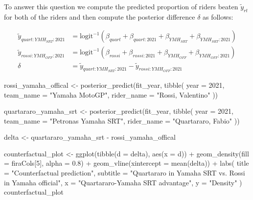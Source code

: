 \documentclass[
]{article}
\newenvironment{Shaded}{\begin{snugshade}}{\end{snugshade}}
\newcommand{\AttributeTok}[1]{\textcolor[rgb]{0.77,0.63,0.00}{#1}}
\newcommand{\DecValTok}[1]{\textcolor[rgb]{0.00,0.00,0.81}{#1}}
\newcommand{\FloatTok}[1]{\textcolor[rgb]{0.00,0.00,0.81}{#1}}
\newcommand{\FunctionTok}[1]{\textcolor[rgb]{0.00,0.00,0.00}{#1}}
\newcommand{\NormalTok}[1]{#1}
\newcommand{\OtherTok}[1]{\textcolor[rgb]{0.56,0.35,0.01}{#1}}
\newcommand{\SpecialCharTok}[1]{\textcolor[rgb]{0.00,0.00,0.00}{#1}}
\newcommand{\StringTok}[1]{\textcolor[rgb]{0.31,0.60,0.02}{#1}}
\begin{document}
To answer this question we compute the predicted proportion of riders
beaten \(\tilde y_{rt}\) for both of the riders and then compute the
posterior difference \(\delta\) as follows:

\[\begin{align*}
\tilde{y}_{quart:YMH_{SRT}:2021} &= \text{logit}^{-1}(\beta_{quart} + \beta_{quart:2021} + \beta_{YMH_{SRT}} + \beta_{YMH_{SRT}:2021})
\\\tilde{y}_{rossi:YMH_{OFF}:2021} &= \text{logit}^{-1}(\beta_{rossi} + \beta_{rossi:2021} + \beta_{YMH_{OFF}} + \beta_{YMH_{OFF}:2021})
\\ \delta &= \tilde{y}_{quart:YMH_{SRT}:2021} - \tilde{y}_{rossi:YMH_{OFF}:2021}
\end{align*}\]

\begin{Shaded}
\begin{Highlighting}[]
\NormalTok{rossi\_yamaha\_offical }\OtherTok{\textless{}{-}} \FunctionTok{posterior\_predict}\NormalTok{(fit\_year, }\FunctionTok{tibble}\NormalTok{(}
  \AttributeTok{year =} \DecValTok{2021}\NormalTok{,}
  \AttributeTok{team\_name =} \StringTok{"Yamaha MotoGP"}\NormalTok{,}
  \AttributeTok{rider\_name =} \StringTok{"Rossi, Valentino"}
\NormalTok{))}

\NormalTok{quartararo\_yamaha\_srt }\OtherTok{\textless{}{-}} \FunctionTok{posterior\_predict}\NormalTok{(fit\_year, }\FunctionTok{tibble}\NormalTok{(}
  \AttributeTok{year =} \DecValTok{2021}\NormalTok{,}
  \AttributeTok{team\_name =} \StringTok{"Petronas Yamaha SRT"}\NormalTok{,}
  \AttributeTok{rider\_name =} \StringTok{"Quartararo, Fabio"}
\NormalTok{))}

\NormalTok{delta }\OtherTok{\textless{}{-}}\NormalTok{ quartararo\_yamaha\_srt }\SpecialCharTok{{-}}\NormalTok{ rossi\_yamaha\_offical}

\NormalTok{counterfactual\_plot }\OtherTok{\textless{}{-}} \FunctionTok{ggplot}\NormalTok{(}\FunctionTok{tibble}\NormalTok{(}\AttributeTok{d =}\NormalTok{ delta), }\FunctionTok{aes}\NormalTok{(}\AttributeTok{x =}\NormalTok{ d)) }\SpecialCharTok{+}
                      \FunctionTok{geom\_density}\NormalTok{(}\AttributeTok{fill =}\NormalTok{ firaCols[}\DecValTok{5}\NormalTok{], }\AttributeTok{alpha =} \FloatTok{0.8}\NormalTok{) }\SpecialCharTok{+}
                      \FunctionTok{geom\_vline}\NormalTok{(}\AttributeTok{xintercept =} \FunctionTok{mean}\NormalTok{(delta)) }\SpecialCharTok{+}
                      \FunctionTok{labs}\NormalTok{(}
                        \AttributeTok{title =} \StringTok{"Counterfactual prediction"}\NormalTok{,}
                        \AttributeTok{subtitle =} \StringTok{"Quartararo in Yamaha SRT vs. Rossi in Yamaha official"}\NormalTok{,}
                        \AttributeTok{x =} \StringTok{"Quartararo{-}Yamaha SRT advantage"}\NormalTok{,}
                        \AttributeTok{y =} \StringTok{"Density"}
\NormalTok{                      )}
\NormalTok{counterfactual\_plot}
\end{Highlighting}
\end{Shaded}
\end{document}
